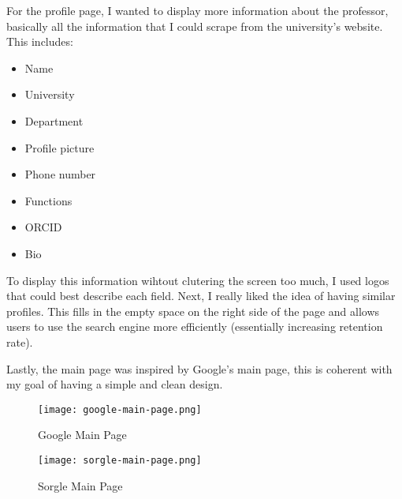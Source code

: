 For the profile page, I wanted to display more information about the professor, basically all the information that I could scrape from the university's website. This includes:
\begin{itemize}
	\item Name
	\item University
	\item Department
	\item Profile picture
	\item Phone number
	\item Functions
	\item ORCID
	\item Bio
\end{itemize}

To display this information wihtout clutering the screen too much, I used logos that could best describe each field. Next, I really liked the idea of having similar profiles. This fills in the empty space on the right side of the page and allows users to use the search engine more efficiently (essentially increasing retention rate).

Lastly, the main page was inspired by Google's main page, this is coherent with my goal of having a simple and clean design.

\begin{figure}[ht]
	\centering
	\begin{minipage}{0.48\textwidth}
		\centering
		\texttt{[image: google-main-page.png]}
		\caption{Google Main Page \cite{google2025}}
		\label{fig:google_main_page}
	\end{minipage}\hfill
	\begin{minipage}{0.48\textwidth}
		\centering
		\texttt{[image: sorgle-main-page.png]}
		\caption{Sorgle Main Page}
		\label{fig:sorgle_main_page}
	\end{minipage}
\end{figure}